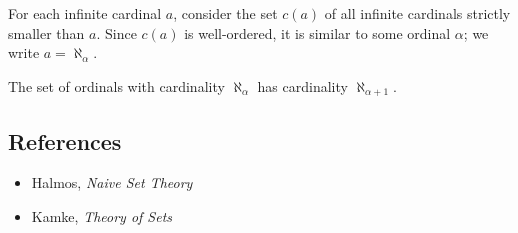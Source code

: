 \begin{defn}
    For each infinite cardinal $a$, consider the set $c(a)$ of all infinite
    cardinals strictly smaller than $a$. Since $c(a)$ is well-ordered, it is
    similar to some ordinal $\alpha$; we write $a=\aleph_\alpha$.
\end{defn}
\begin{prop}
    The set of ordinals with cardinality $\aleph_\alpha$ has cardinality
    $\aleph_{\alpha+1}$.
\end{prop}
\subsection*{References}
\begin{itemize}
  \item Halmos, \emph{Naive Set Theory}
  \item Kamke, \emph{Theory of Sets}
\end{itemize}
